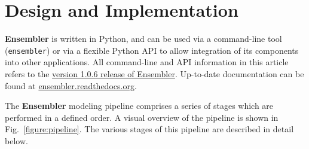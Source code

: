\documentclass[aps,prl,preprint,nofootinbib,superscriptaddress,linenumbers]{revtex4-1}
\begin{document}
\section{Design and Implementation}

{\bf Ensembler} is written in Python, and can be used via a command-line tool ({\tt ensembler}) or via a flexible Python API to allow integration of its components into other applications.
All command-line and API information in this article refers to the \href{https://github.com/choderalab/ensembler/releases/tag/v1.0.6}{version 1.0.6 release of Ensembler}.
Up-to-date documentation can be found at \href{http://ensembler.readthedocs.org/en/latest/}{ensembler.readthedocs.org}.

The {\bf Ensembler} modeling pipeline comprises a series of stages which are performed in a defined order. 
A visual overview of the pipeline is shown in Fig.~\ref{figure:pipeline}.
The various stages of this pipeline are described in detail below.

\begin{figure*}[tb]

  \caption{{\bf Diagrammatic representation of the stages of the Ensembler pipeline and illustrative statistics for modeling all human tyrosine kinase catalytic domains.}
  On the left, the various stages of the {\bf Ensembler} pipeline are shown.
  The red labels indicate the corresponding text description provided for each stage in the Design and Implementation section.
  On the right, the number of viable models surviving each stage of the pipeline is shown for the 93 target TK domains and for two representative individual TK domains (\emph{SRC} and \emph{ABL}).
  Typical timings on a computer cluster (containing Intel Xeon E5-2665 2.4GHz hyperthreaded processors and NVIDIA GTX-680 or GTX-Titan GPUs) is reported to illustrate resource requirements per model for modeling the entire set of tyrosine kinases.
  Note that \emph{CPU-h} denotes the number of hours consumed by the equivalent of a single CPU hyperthread and \emph{GPU-h} on a single GPU---parallel execution via MPI reduces wall clock time nearly linearly.
  \label{figure:pipeline}
  }
\end{figure*}
\end{document}
